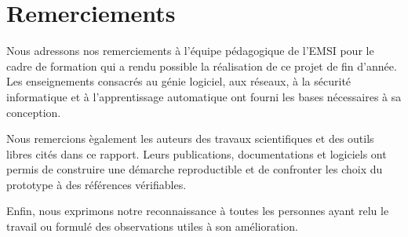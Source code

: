\chapter*{Remerciements}

Nous adressons nos remerciements \`a l'\'equipe p\'edagogique de l'EMSI pour le
cadre de formation qui a rendu possible la r\'ealisation de ce projet de fin
d'ann\'ee.
Les enseignements consacr\'es au g\'enie logiciel, aux r\'eseaux, \`a la s\'ecurit\'e
informatique et \`a l'apprentissage automatique ont fourni les bases
n\'ecessaires \`a sa conception.

Nous remercions \`egalement les auteurs des travaux scientifiques et des outils
libres cit\'es dans ce rapport. Leurs publications, documentations et logiciels
ont permis de construire une d\'emarche reproductible et de confronter les choix
du prototype \`a des r\'ef\'erences v\'erifiables.

Enfin, nous exprimons notre reconnaissance \`a toutes les personnes ayant relu
le travail ou formul\'e des observations utiles \`a son am\'elioration.

